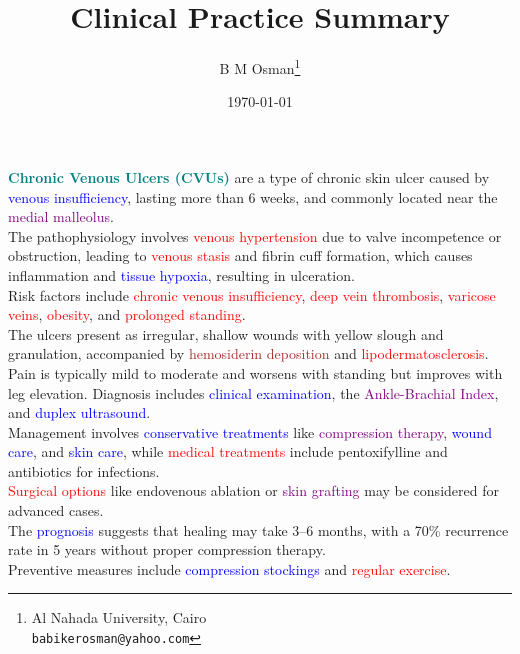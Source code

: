 \documentclass{article}
\title{Clinical Practice Summary}
\author{B M Osman\footnote{Al Nahada University, Cairo \\ \texttt{babikerosman@yahoo.com}}}
\date{\today}
\begin{document}
\maketitle


\textcolor{teal}{\Large \bf Chronic Venous Ulcers (CVUs)} are a type of chronic skin ulcer caused by \textcolor{blue}{venous insufficiency}, lasting more than 6 weeks, and commonly located near the \textcolor{purple}{medial malleolus}.\\
The pathophysiology involves \textcolor{red}{venous hypertension} due to valve incompetence or obstruction, leading to \textcolor{red}{venous stasis} and fibrin cuff formation, which causes \textcolor{dark red}{inflammation} and \textcolor{blue}{tissue hypoxia}, resulting in ulceration. \\


Risk factors include \textcolor{red}{chronic venous insufficiency}, \textcolor{red}{deep vein thrombosis}, \textcolor{red}{varicose veins}, \textcolor{red}{obesity}, and \textcolor{red}{prolonged standing}.\\


The ulcers present as \textcolor{dark red}{irregular, shallow wounds} with yellow slough and granulation, accompanied by \textcolor{brown}{hemosiderin deposition} and \textcolor{red}{lipodermatosclerosis}.\\


Pain is typically \textcolor{dark red}{mild to moderate} and worsens with standing but improves with leg elevation. Diagnosis includes \textcolor{blue}{clinical examination}, the \textcolor{purple}{Ankle-Brachial Index}, and \textcolor{blue}{duplex ultrasound}.\\


Management involves \textcolor{blue}{conservative treatments} like \textcolor{purple}{compression therapy}, \textcolor{blue}{wound care}, and \textcolor{blue}{skin care}, while \textcolor{red}{medical treatments} include \textcolor{dark red}{pentoxifylline} and \textcolor{dark red}{antibiotics} for infections.\\
\textcolor{red}{Surgical options} like endovenous ablation or \textcolor{purple}{skin grafting} may be considered for advanced cases.\\


The \textcolor{blue}{prognosis} suggests that healing may take 3–6 months, with a 70\% recurrence rate in 5 years without proper compression therapy.\\
Preventive measures include \textcolor{blue}{compression stockings} and \textcolor{red}{regular exercise}.
\end{document}
